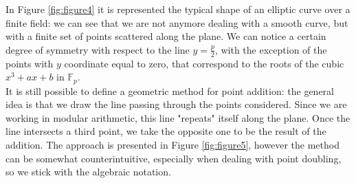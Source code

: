 In Figure \ref{fig:figure4} it is represented the typical shape of an elliptic curve over a finite field: we can see that we are not anymore dealing with a smooth curve, but with a finite set of points scattered along the plane. We can notice a certain degree of symmetry with respect to the line $y = \frac{p}{2}$, with the exception of the points with $y$ coordinate equal to zero, that correspond to the roots of the cubic $x^3 + ax + b$ in $\mathbb{F}_p$.
\\
It is still possible to define a geometric method for point addition: the general idea is that we draw the line passing through the points considered. Since we are working in modular arithmetic, this line "repeats" itself along the plane. Once the line intersects a third point, we take the opposite one to be the result of the addition. The approach is presented in Figure \ref{fig:figure5}, however the method can be somewhat counterintuitive, especially when dealing with point doubling, so we stick with the algebraic notation.

